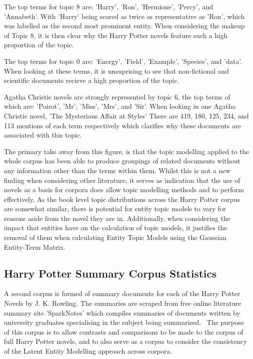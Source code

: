 \documentclass[10pt]{report}
\begin{document}
The top terms for topic 8 are: 'Harry', 'Ron', 'Hermione', 'Percy', and 'Annabeth'. With 'Harry' being scored as twice as representative as 'Ron', which was labelled as the second most prominent entity. When considering the makeup of Topic 8, it is then clear why the Harry Potter novels feature such a high proportion of the topic.

The top terms for topic 0 are: 'Energy', 'Field', 'Example', 'Species', and 'data'. When looking at these terms, it is unsuprising to see that non-fictional and scientific documents recieve a high proportion of the topic.

Agatha Christie novels are strongly represented by topic 6, the top terms of which are: 'Poirot', 'Mr', 'Miss', 'Mrs', and 'Sir'. When looking in one Agatha Christie novel, 'The Mysterious Affair at Styles' There are 419, 180, 125, 234, and 113 mentions of each term respectively which clarifies why these documents are associated with this topic.

The primary take away from this figure, is that the topic modelling applied to the whole corpus has been able to produce groupings of related documents without any information other than the terms within them. Whilst this is not a new finding when considering other literature, it serves as indication that the use of novels as a basis for corpora does allow topic modelling methods and to perform effectively, As the book level topic distributions across the Harry Potter corpus are somewhat similar, there is potential for entity topic models to vary for reasons aside from the novel they are in. Additionally, when considering the impact that entities have on the calculation of topic models, it justifies the removal of them when calculating Entity Topic Models using the Gaussian Entity-Term Matrix.

\subsection{Harry Potter Summary Corpus Statistics}
A second corpus is formed of summary documents for each of the Harry Potter Novels by J. K. Rowling. The summaries are scraped from free online literature summary site 'SparkNotes' which compiles summaries of documents written by university graduates specialising in the subject being summarised.~\cite{noauthor_undated-kh} The purpose of this corpus is to allow contrasts and comparisons to be made to the corpus of full Harry Potter novels, and to also serve as a corpus to consider the consistency of the Latent Entity Modelling approach across corpora.
\end{document}
